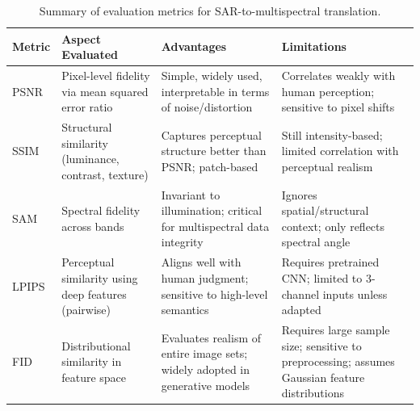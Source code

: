 \begin{table}[h!]
	\centering
	\caption{Summary of evaluation metrics for SAR-to-multispectral translation.}
	\begin{tabularx}{\textwidth}{p{1.7cm}X X X}
		\toprule 
		\textbf{Metric} & \textbf{Aspect Evaluated} & \textbf{Advantages} & \textbf{Limitations} \\
		\midrule 
		PSNR  & Pixel-level fidelity via mean squared error ratio & Simple, widely used, interpretable in terms of noise/distortion & Correlates weakly with human perception; sensitive to pixel shifts \\
		SSIM  & Structural similarity (luminance, contrast, texture) & Captures perceptual structure better than PSNR; patch-based & Still intensity-based; limited correlation with perceptual realism \\
		SAM   & Spectral fidelity across bands & Invariant to illumination; critical for multispectral data integrity & Ignores spatial/structural context; only reflects spectral angle \\
		LPIPS & Perceptual similarity using deep features (pairwise) & Aligns well with human judgment; sensitive to high-level semantics & Requires pretrained CNN; limited to 3-channel inputs unless adapted \\
		FID   & Distributional similarity in feature space & Evaluates realism of entire image sets; widely adopted in generative models & Requires large sample size; sensitive to preprocessing; assumes Gaussian feature distributions \\
		\bottomrule
	\end{tabularx}
\end{table}
